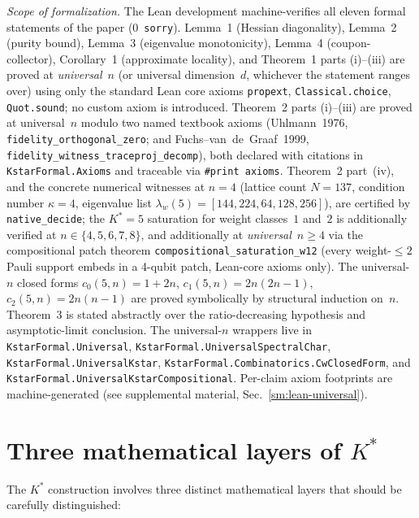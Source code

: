 \documentclass[twocolumn,prx,aps,superscriptaddress,longbibliography,floatfix]{revtex4-2}
\begin{document}
\medskip
\begin{sloppypar}\raggedright
\noindent\emph{Scope of formalization.}
The Lean development machine-verifies all eleven formal statements
of the paper (0~\texttt{sorry}).  Lemma~1 (Hessian diagonality),
Lemma~2 (purity bound), Lemma~3 (eigenvalue monotonicity),
Lemma~4 (coupon-collector), Corollary~1 (approximate locality),
and Theorem~1 parts (i)--(iii) are proved at
\emph{universal}~$n$ (or universal dimension~$d$, whichever
the statement ranges over) using only the standard Lean core
axioms \texttt{propext}, \texttt{Classical.choice},
\texttt{Quot.sound}; no custom axiom is introduced.
Theorem~2 parts (i)--(iii) are proved at universal~$n$ modulo two
named textbook axioms (Uhlmann~1976,
\texttt{fidelity\_orthogonal\_zero}; and Fuchs--van~de~Graaf~1999,
\texttt{fidelity\_witness\_traceproj\_decomp}), both declared
with citations in \texttt{KstarFormal.Axioms} and traceable via
\texttt{\#print axioms}.  Theorem~2 part~(iv), and the concrete
numerical witnesses at $n=4$ (lattice count $N=137$, condition
number $\kappa=4$, eigenvalue list $\lambda_w(5)=[144,224,64,128,256]$),
are certified by \texttt{native\_decide}; the $K^*=5$ saturation
for weight classes~$1$ and~$2$ is additionally verified at
$n\in\{4,5,6,7,8\}$, and additionally at \emph{universal}~$n\ge4$
via the compositional patch theorem
\texttt{compositional\_saturation\_w12} (every weight-$\le2$ Pauli
support embeds in a 4-qubit patch, Lean-core axioms only).
The universal-$n$ closed forms
$c_0(5,n)=1+2n$, $c_1(5,n)=2n(2n{-}1)$, $c_2(5,n)=2n(n{-}1)$
are proved symbolically by structural induction on~$n$.
Theorem~3 is stated abstractly over the ratio-decreasing
hypothesis and asymptotic-limit conclusion.
The universal-$n$ wrappers live in \texttt{KstarFormal.Universal},
\texttt{KstarFormal.UniversalSpectralChar},
\texttt{KstarFormal.UniversalKstar},
\texttt{KstarFormal.Combinatorics.CwClosedForm}, and
\texttt{KstarFormal.UniversalKstarCompositional}.
Per-claim axiom footprints are machine-generated (see
supplemental material, Sec.~\ref{sm:lean-universal}).
\end{sloppypar}


\section{Three mathematical layers of $K^*$}
\label{sec:layers}

The $K^*$ construction involves three distinct mathematical layers
that should be carefully distinguished:
\end{document}
